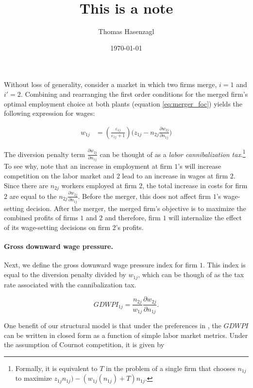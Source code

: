 \documentclass[10 pt,a4paper]{article}
\title{This is a note}
\author{Thomas Hasenzagl}
\date{\today}
\begin{document}
Without loss of generality, consider a market in which two firms merge, $i=1$ and $i'=2$.
Combining and rearranging the first order conditions for the merged firm's optimal employment choice at both plants (equation \ref{eq:merger_foc}) yields the following expression for wages:

\begin{align}
	\label{eq:diversion_dwp}
w_{1j} & = \left(\frac{\varepsilon_{1j}}{\varepsilon_{1j} + 1}\right) \Bigg( z_{1j} - n_{2j} \frac{\partial w_{2j}}{\partial n_{1j}}\Bigg)
\end{align}

The diversion penalty term \(\frac{\partial w_{2j}}{\partial n_{1j}}\) can be thought of as a \emph{labor cannibalization tax}.\footnote{Formally, it is equivalent to \(T\) in the problem of a single firm that chooses \(n_{1j}\) to maximize \(z_{1j} n_{1j}) - (w_{1j}(n_{1j})+T) n_{1j}.\)} To see why, note that an increase in employment at firm \(1\)'s will increase competition on the labor market and \(2\) lead to an increase in wages at firm \(2\). Since there are \(n_{2j}\) workers employed at firm \(2\), the total increase in costs for firm \(2\) are equal to the \(n_{2j} \frac{\partial w_{2j}}{\partial n_{1j}}\). Before the merger, this does not affect firm \(1\)'s wage-setting decision. After the merger, the merged firm's objective is to maximize the combined profits of firms \(1\) and \(2\) and therefore, firm \(1\) will internalize the effect of its wage-setting decisions on firm \(2\)'s profits. 

\paragraph{Gross downward wage pressure.}

Next, we define the gross downward wage pressure index for firm \(1\). This index is equal to the diversion penalty divided by \(w_{1j}\), which can be though of as the tax rate associated with the cannibalization tax.  

\begin{equation}
	GDWPI_{1j} = \frac{n_{2j}}{w_{1j}} \frac{\partial w_{2j}}{\partial n_{1j}}.
\end{equation} 

One benefit of our structural model is that under the preferences in \citet{berger2022labor}, the \(GDWPI\) can be written in closed form as a function of simple labor market metrics. Under the assumption of Cournot competition, it is given by
\end{document}
